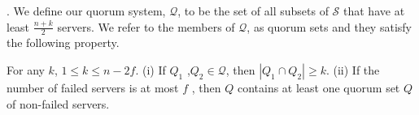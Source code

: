 . We define our quorum system, $\mathcal{Q}$, to be the set of all subsets of $\mathcal{S}$ that have at least $\frac{n+k}{2}$ servers. We refer to the members of $\mathcal{Q}$, as quorum sets and they satisfy the following property.

\begin{lemma}
For any $k$,  $1 \leq k \leq n -2f$. (i) If $Q_1$ ,$Q_2 \in \mathcal{Q}$,
then $|Q_1 \cap Q_2 | \geq k$. (ii) If the number of failed servers is
at most $f$ , then $Q$ contains at least one quorum set $Q$ of
non-failed servers.
\end{lemma}


%

